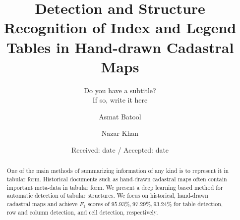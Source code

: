 \title{Detection and Structure Recognition of Index and Legend Tables in Hand-drawn Cadastral Maps%
}
\subtitle{Do you have a subtitle?\\ If so, write it here}


\author{Asmat Batool \and
        Nazar Khan %
}



\date{Received: date / Accepted: date}


\maketitle

\begin{abstract}
One of the main methods of summarizing information of any kind is to represent it in tabular form. Historical documents such as hand-drawn cadastral maps often contain important meta-data in tabular form. We present a deep learning based method for automatic detection of tabular structures. We focus on historical, hand-drawn cadastral maps and achieve $F_1$ scores of $95.93\%, 97.29\%, 93.24\%$ for table detection, row and column detection, and cell detection, respectively.

\end{abstract}

